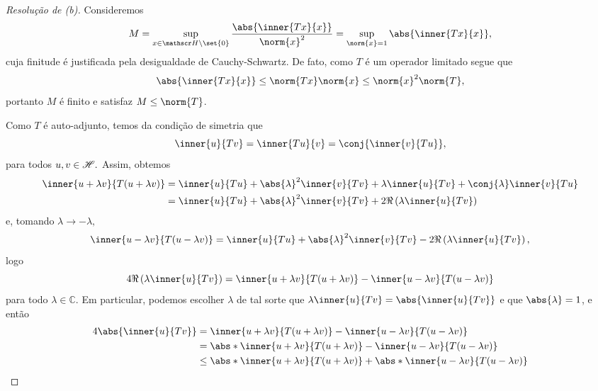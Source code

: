 \begin{proof}[Resolução de (b)]
  Consideremos
  \begin{equation*}
    M = \sup_{x \in \hilbert\setminus\set{0}}{\frac{\abs{\inner{Tx}{x}}}{\norm{x}^2}} = \sup_{\norm{x} = 1}{\abs{\inner{Tx}{x}}},
  \end{equation*}
  cuja finitude é justificada pela desigualdade de Cauchy-Schwartz. De fato, como \(T\) é um operador limitado segue que
  \begin{equation*}
    \abs{\inner{Tx}{x}} \leq \norm{Tx} \norm{x} \leq \norm{x}^2\norm{T},
  \end{equation*}
  portanto \(M\) é finito e satisfaz \(M \leq \norm{T}\).

  Como \(T\) é auto-adjunto, temos da condição de simetria que
  \begin{equation*}
    \inner{u}{Tv} = \inner{Tu}{v} = \conj{\inner{v}{Tu}},
  \end{equation*}
  para todos \(u, v\in\mathscr{H}.\) Assim, obtemos
  \begin{align*}
    \inner{u + \lambda v}{T(u + \lambda v)} &= \inner{u}{Tu} + \abs{\lambda}^2\inner{v}{Tv} + \lambda\inner{u}{Tv} + \conj{\lambda} \inner{v}{Tu}\\
                                            &= \inner{u}{Tu} + \abs{\lambda}^2 \inner{v}{Tv} + 2 \Re\left(\lambda \inner{u}{Tv}\right)
  \end{align*}
  e, tomando \(\lambda \to -\lambda,\)
  \begin{equation*}
      \inner{u - \lambda v}{T(u - \lambda v)} = \inner{u}{Tu} + \abs{\lambda}^2 \inner{v}{Tv} - 2 \Re\left(\lambda \inner{u}{Tv}\right),
  \end{equation*}
  logo
  \begin{equation*}
    4 \Re\left(\lambda \inner{u}{Tv}\right) = \inner{u + \lambda v}{T(u + \lambda v)} - \inner{u - \lambda v}{T(u - \lambda v)}
  \end{equation*}
  para todo \(\lambda \in \mathbb{C}\). Em particular, podemos escolher \(\lambda\) de tal sorte que \(\lambda \inner{u}{Tv} = \abs{\inner{u}{Tv}}\) e que \(\abs{\lambda} = 1\), e então
  \begin{align*}
    4 \abs{\inner{u}{Tv}} &= \inner{u + \lambda v}{T(u + \lambda v)} - \inner{u - \lambda v}{T(u - \lambda v)}\\
                          &= \abs*{\inner{u + \lambda v}{T(u + \lambda v)} - \inner{u - \lambda v}{T(u - \lambda v)}}\\
                          &\leq \abs*{\inner{u + \lambda v}{T(u + \lambda v)}} + \abs*{\inner{u - \lambda v}{T(u - \lambda v)}}\\

\end{align*}
\end{proof}
